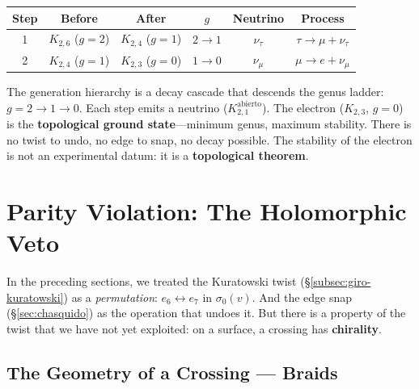 \begin{center}
\renewcommand{\arraystretch}{1.2}
\begin{tabular}{cccccc}
\toprule
Step & Before & After & $g$ & Neutrino & Process \\
\midrule
1 & $K_{2,6}$ ($g{=}2$) & $K_{2,4}$ ($g{=}1$) & $2 \to 1$
  & $\nu_\tau$ & $\tau \to \mu + \nu_\tau$ \\
2 & $K_{2,4}$ ($g{=}1$) & $K_{2,3}$ ($g{=}0$) & $1 \to 0$
  & $\nu_\mu$ & $\mu \to e + \nu_\mu$ \\
\bottomrule
\end{tabular}
\end{center}

\begin{result}[title={The electron is the topological ground state}]
The generation hierarchy is a decay cascade that
descends the genus ladder: $g = 2 \to 1 \to 0$. Each step
emits a neutrino ($K_{2,1}^{\mathrm{abierto}}$). The electron ($K_{2,3}$, $g = 0$) is
the \textbf{topological ground state}---minimum genus, maximum
stability. There is no twist to undo, no edge to snap, no
decay possible. The stability of the electron is not an
experimental datum: it is a \textbf{topological theorem}.
\end{result}


\section{Parity Violation: The Holomorphic Veto}
\label{sec:parity-violation}


In the preceding sections, we treated the Kuratowski twist
(\S\ref{subsec:giro-kuratowski}) as a \emph{permutation}:
$e_6 \leftrightarrow e_7$ in $\sigma_0(v)$. And the edge snap
(\S\ref{sec:chasquido}) as the operation that undoes it. But there is a
property of the twist that we have not yet exploited: on a surface, a
crossing has \textbf{chirality}.

\subsection{The Geometry of a Crossing --- Braids}

